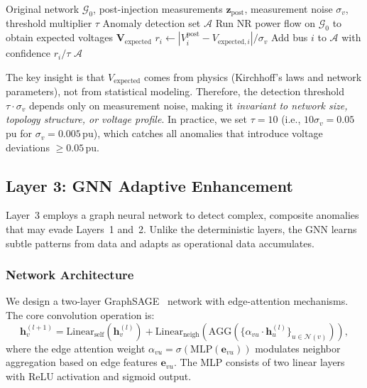 \documentclass[research]{fcs}
\begin{document}
\begin{algorithm}[htbp]
\caption{Differential Physics Detector}

\begin{algorithmic}[1]
\REQUIRE Original network $\mathcal{G}_0$, post-injection measurements $\mathbf{z}_{\text{post}}$, measurement noise $\sigma_v$, threshold multiplier $\tau$
\ENSURE Anomaly detection set $\mathcal{A}$
\STATE Run NR power flow on $\mathcal{G}_0$ to obtain expected voltages $\mathbf{V}_{\text{expected}}$
\STATE $r_i \leftarrow |V_i^{\text{post}} - V_{\text{expected},i}| / \sigma_v$
\STATE Add bus $i$ to $\mathcal{A}$ with confidence $r_i / \tau$
\ENDIF
\ENDFOR
\RETURN $\mathcal{A}$
\end{algorithmic}
\end{algorithm}

The key insight is that $V_{\text{expected}}$ comes from physics (Kirchhoff's laws and network parameters), not from statistical modeling. Therefore, the detection threshold $\tau \cdot \sigma_v$ depends only on measurement noise, making it \emph{invariant to network size, topology structure, or voltage profile}. In practice, we set $\tau = 10$ (i.e., $10\sigma_v = 0.05$\,pu for $\sigma_v = 0.005$\,pu), which catches all anomalies that introduce voltage deviations $\geq 0.05$\,pu.

\subsection{Layer 3: GNN Adaptive Enhancement}

Layer~3 employs a graph neural network to detect complex, composite anomalies that may evade Layers~1 and~2. Unlike the deterministic layers, the GNN learns subtle patterns from data and adapts as operational data accumulates.

\subsubsection{Network Architecture}

We design a two-layer GraphSAGE~\cite{hamilton2017inductive} network with edge-attention mechanisms. The core convolution operation is:
\begin{equation}
\mathbf{h}_v^{(l+1)} = \text{Linear}_{\text{self}}(\mathbf{h}_v^{(l)}) + \text{Linear}_{\text{neigh}}\left(\text{AGG}\left(\{\alpha_{vu} \cdot \mathbf{h}_u^{(l)}\}_{u \in \mathcal{N}(v)}\right)\right),
\end{equation}
where the edge attention weight $\alpha_{vu} = \sigma(\text{MLP}(\mathbf{e}_{vu}))$ modulates neighbor aggregation based on edge features $\mathbf{e}_{vu}$. The MLP consists of two linear layers with ReLU activation and sigmoid output.
\end{document}

